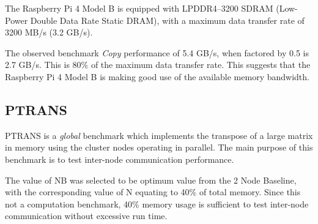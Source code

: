 The Raspberry Pi 4 Model B is equipped with LPDDR4–3200 SDRAM (Low-Power Double Data Rate Static DRAM), with a maximum data transfer rate of 3200 MB/s (3.2 GB/s).

The observed benchmark \emph{Copy} performance of 5.4 GB/s, when factored by 0.5 is 2.7 GB/s. This is 80\% of the maximum data transfer rate. This suggests that the Raspberry Pi 4 Model B is making good use of the available memory bandwidth. 



%
%
\subsection{PTRANS}

PTRANS is a \emph{global} benchmark which implements the transpose of a large matrix in memory using the cluster nodes operating in parallel. The main purpose of this benchmark is to test inter-node communication performance.

The value of NB was selected to be optimum value from the 2 Node Baseline, with the corresponding value of N equating to 40\% of total memory. Since this not a computation benchmark, 40\% memory usage is sufficient to test inter-node communication without excessive run time. 



